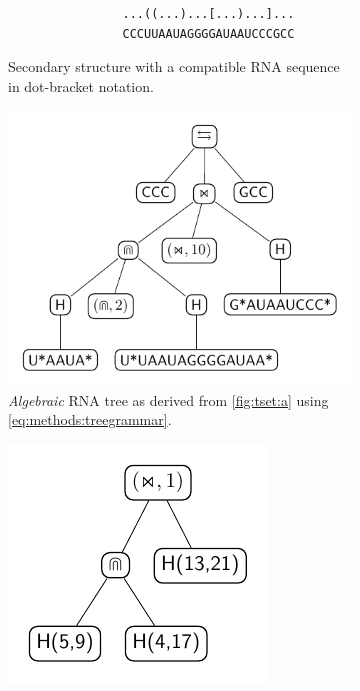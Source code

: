 \documentclass[../../master.tex]{subfiles}
\begin{document}
\begin{figure}[!ht]
	\centering
	\begin{subfigure}[t]{0.3\textwidth}
		\begin{minipage}[b][4cm][c]{0.3\textwidth}
			\small
			\begin{verbatim}				
				...((...)...[...)...]...
				CCCUUAAUAGGGGAUAAUCCCGCC
			\end{verbatim}
		\end{minipage}
		\caption{Secondary structure with a compatible RNA sequence in dot-bracket notation.
		}\label{fig:tset:a}
	\end{subfigure}%
	\begin{subfigure}[t]{0.4\textwidth}
		\centering
		\includegraphics[width=\textwidth]{pic/results/aspratree/tset.pdf}
		\caption{\textit{Algebraic} RNA tree as derived from \autoref{fig:tset:a} using \eqref{eq:methods:treegrammar}.
		}\label{fig:tset:b}
	\end{subfigure}
	\begin{subfigure}[t]{0.28\textwidth}
		\centering
		\includegraphics[width=\textwidth]{pic/results/aspratree/tset_struct.pdf}

\end{subfigure}
\end{figure}
\end{document}
